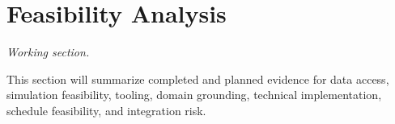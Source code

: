 \section{Feasibility Analysis}
\label{sec:feasibility}

\textit{Working section.}

This section will summarize completed and planned evidence for data access,
simulation feasibility, tooling, domain grounding, technical implementation,
schedule feasibility, and integration risk.

